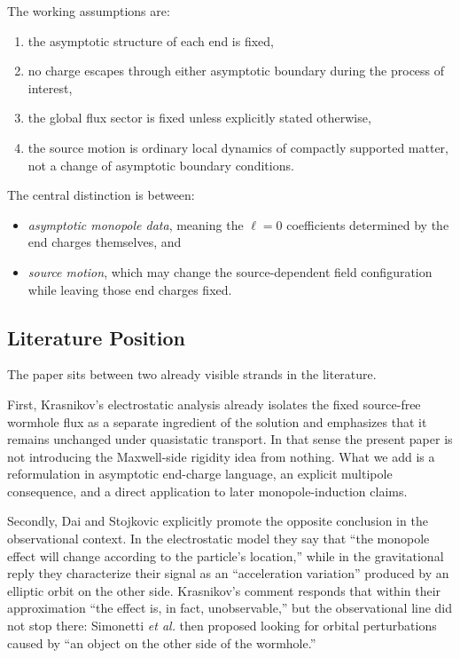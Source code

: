 \documentclass[aps,prd,onecolumn,nofootinbib,superscriptaddress]{revtex4-2}
\begin{document}
The working assumptions are:
\begin{enumerate}
    \item the asymptotic structure of each end is fixed,
    \item no charge escapes through either asymptotic boundary during the process of interest,
    \item the global flux sector is fixed unless explicitly stated otherwise,
    \item the source motion is ordinary local dynamics of compactly supported matter, not a change of asymptotic boundary conditions.
\end{enumerate}

The central distinction is between:
\begin{itemize}
    \item \emph{asymptotic monopole data}, meaning the $\ell=0$ coefficients determined by the end charges themselves, and
    \item \emph{source motion}, which may change the source-dependent field configuration while leaving those end charges fixed.
\end{itemize}

\subsection*{Literature Position}

The paper sits between two already visible strands in the literature.

First, Krasnikov's electrostatic analysis already isolates the fixed source-free wormhole flux as a separate ingredient of the solution and emphasizes that it remains unchanged under quasistatic transport.\cite{Krasnikov2008ElectrostaticInteraction} In that sense the present paper is not introducing the Maxwell-side rigidity idea from nothing. What we add is a reformulation in asymptotic end-charge language, an explicit multipole consequence, and a direct application to later monopole-induction claims.

Secondly, Dai and Stojkovic explicitly promote the opposite conclusion in the observational context. In the electrostatic model they say that ``the monopole effect will change according to the particle's location,'' while in the gravitational reply they characterize their signal as an ``acceleration variation'' produced by an elliptic orbit on the other side.\cite{DaiStojkovic2019Observing,DaiStojkovic2020ReplyObserving} Krasnikov's comment responds that within their approximation ``the effect is, in fact, unobservable,''\cite{Krasnikov2020CommentObserving} but the observational line did not stop there: Simonetti \emph{et al.} then proposed looking for orbital perturbations caused by ``an object on the other side of the wormhole.''\cite{SimonettiEtAl2021SensitiveSearches}
\end{document}
